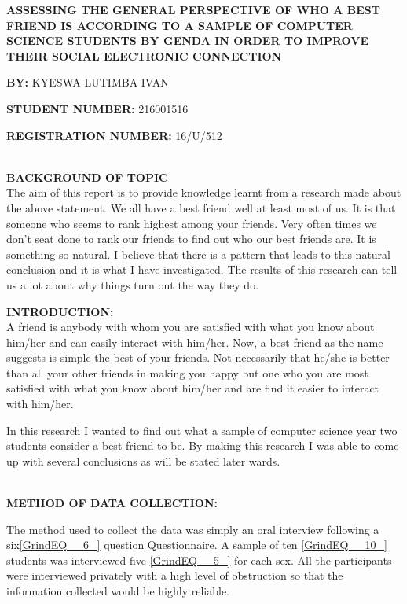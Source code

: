 \documentclass[11pt,a4paper,final]{report}
\begin{document}


\noindent \textbf{ASSESSING THE GENERAL PERSPECTIVE OF WHO A BEST FRIEND IS ACCORDING TO A SAMPLE OF COMPUTER SCIENCE STUDENTS BY GENDA IN ORDER TO IMPROVE THEIR SOCIAL ELECTRONIC CONNECTION}

\noindent \textbf{}

\noindent \textbf{BY: }KYESWA LUTIMBA IVAN\textbf{}

\noindent \textbf{STUDENT NUMBER: }216001516

\noindent \textbf{REGISTRATION NUMBER: }16/U/512

\noindent\\

\noindent \textbf{BACKGROUND OF TOPIC}\\

\noindent The aim of this report is to provide knowledge learnt from a research made about the above statement. We all have a best friend well at least most of us. It is that someone who seems to rank highest among your friends. Very often times we don't seat done to rank our friends to find out who our best friends are. It is something so natural. I believe that there is a pattern that leads to this natural conclusion and it is what I have investigated. The results of this research can tell us a lot about why things turn out the way they do.\\

\noindent 

\noindent \textbf{INTRODUCTION:}
\\
\noindent A friend is anybody with whom you are satisfied with what you know about him/her and can easily interact with him/her. Now, a best friend as the name suggests is simple the best of your friends. Not necessarily that he/she is better than all your other friends in making you happy but one who you are most satisfied with what you know about him/her and  are find it easier to interact with him/her.

\noindent In this research I wanted to find out what a sample of computer science year two students consider a best friend to be. By making this research I was able to come up with several conclusions as will be stated later wards.

\noindent \\

\noindent \textbf{METHOD OF DATA COLLECTION:}

\noindent The method used to collect the data was simply an oral interview following a six\eqref{GrindEQ__6_} question Questionnaire. A sample of ten \eqref{GrindEQ__10_} students was interviewed five \eqref{GrindEQ__5_} for each sex. All the participants were interviewed privately with a high level of obstruction so that the information collected would be highly reliable.
\end{document}
